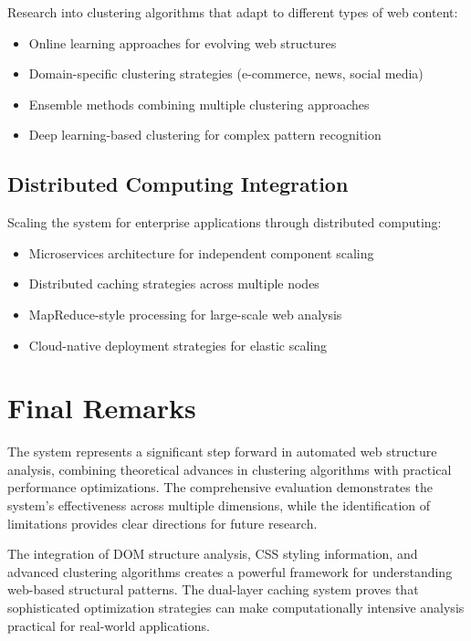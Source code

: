 Research into clustering algorithms that adapt to different types of web content:

\begin{itemize}
\item Online learning approaches for evolving web structures
\item Domain-specific clustering strategies (e-commerce, news, social media)
\item Ensemble methods combining multiple clustering approaches
\item Deep learning-based clustering for complex pattern recognition
\end{itemize}

\subsection{Distributed Computing Integration}

Scaling the system for enterprise applications through distributed computing:

\begin{itemize}
\item Microservices architecture for independent component scaling
\item Distributed caching strategies across multiple nodes
\item MapReduce-style processing for large-scale web analysis
\item Cloud-native deployment strategies for elastic scaling
\end{itemize}

\section{Final Remarks}
\label{sec:final_remarks}

The {\name} system represents a significant step forward in automated web structure analysis, combining theoretical advances in clustering algorithms with practical performance optimizations. The comprehensive evaluation demonstrates the system's effectiveness across multiple dimensions, while the identification of limitations provides clear directions for future research.

The integration of DOM structure analysis, CSS styling information, and advanced clustering algorithms creates a powerful framework for understanding web-based structural patterns. The dual-layer caching system proves that sophisticated optimization strategies can make computationally intensive analysis practical for real-world applications.

